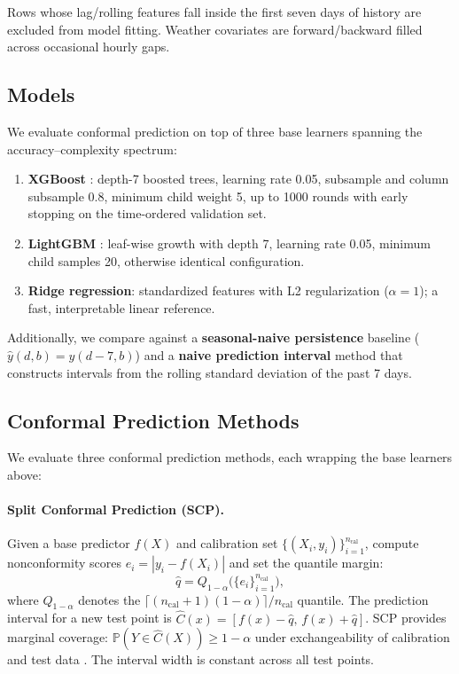 \documentclass[preprint,12pt]{elsarticle}
\begin{document}
\begin{enumerate}
Rows whose lag/rolling features fall inside the first seven days of history are excluded from model fitting. Weather covariates are forward/backward filled across occasional hourly gaps.

\subsection{Models}\label{sec:models}

We evaluate conformal prediction on top of three base learners spanning the accuracy--complexity spectrum:

\begin{enumerate}
  \item \textbf{XGBoost} \citep{chen2016xgboost}: depth-7 boosted trees, learning rate 0.05, subsample and column subsample 0.8, minimum child weight 5, up to 1000 rounds with early stopping on the time-ordered validation set.
  \item \textbf{LightGBM} \citep{ke2017lightgbm}: leaf-wise growth with depth 7, learning rate 0.05, minimum child samples 20, otherwise identical configuration.
  \item \textbf{Ridge regression}: standardized features with L2 regularization ($\alpha=1$); a fast, interpretable linear reference.
\end{enumerate}

Additionally, we compare against a \textbf{seasonal-naive persistence} baseline ($\hat{y}(d,b) = y(d-7,b)$) and a \textbf{naive prediction interval} method that constructs intervals from the rolling standard deviation of the past 7 days.

\subsection{Conformal Prediction Methods}\label{sec:cp}

We evaluate three conformal prediction methods, each wrapping the base learners above:

\paragraph{Split Conformal Prediction (SCP).}
Given a base predictor $f(X)$ and calibration set $\{(X_i, y_i)\}_{i=1}^{n_{\text{cal}}}$, compute nonconformity scores $e_i = |y_i - f(X_i)|$ and set the quantile margin:
\begin{equation}
  \hat{q} = Q_{1-\alpha}\bigl(\{e_i\}_{i=1}^{n_{\text{cal}}}\bigr),
  \label{eq:scp}
\end{equation}
where $Q_{1-\alpha}$ denotes the $\lceil(n_{\text{cal}}+1)(1-\alpha)\rceil / n_{\text{cal}}$ quantile. The prediction interval for a new test point is $\hat{C}(x) = [f(x) - \hat{q}, \, f(x) + \hat{q}]$.
SCP provides marginal coverage: $\mathbb{P}(Y \in \hat{C}(X)) \ge 1-\alpha$ under exchangeability of calibration and test data \citep{lei2018}. The interval width is constant across all test points.


\end{enumerate}
\end{document}
